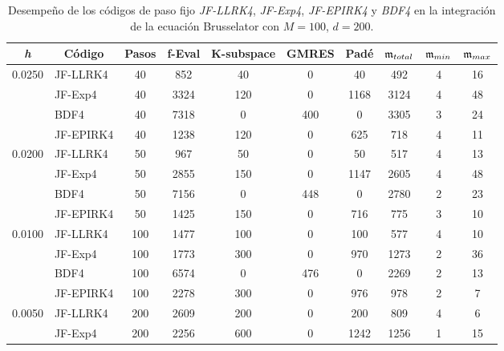 \begin{table}[htb]
	\caption{Desempeño de los códigos de paso fijo \textit{JF-LLRK4}, \textit{JF-Exp4}, \textit{JF-EPIRK4} y \textit{BDF4} en la integración de la ecuación Brusselator con $M=100$, $d=200$.}
	\centering
	\begin{adjustbox}{width=0.9\columnwidth,center}
		\begin{tabular}{cccccccccc}
			\hline
			\textit{h} & Código & Pasos & f-Eval & K-subspace & GMRES & Padé & $\mathfrak{m}_{total}$ & $\mf%
			_{min}$ & $\mathfrak{m}_{max}$ \\ \hline
			\multicolumn{1}{l}{0.0250} & \multicolumn{1}{l}{JF-LLRK4} & 40 & 852 & 40 &
			0 & 40 & 492 & 4 & 16 \\
			\multicolumn{1}{l}{} & \multicolumn{1}{l}{JF-Exp4} & 40 & 3324 & 120 & 0 &
			1168 & 3124 & 4 & 48 \\
			\multicolumn{1}{l}{} & \multicolumn{1}{l}{BDF4} & 40 & 7318 & 0 & 400 & 0 &
			3305 & 3 & 24 \\
			\multicolumn{1}{l}{} & \multicolumn{1}{l}{JF-EPIRK4} & 40 & 1238 & 120 & 0 &
			625 & 718 & 4 & 11 \\
			\multicolumn{1}{l}{0.0200} & \multicolumn{1}{l}{JF-LLRK4} & 50 & 967 & 50 &
			0 & 50 & 517 & 4 & 13 \\
			\multicolumn{1}{l}{} & \multicolumn{1}{l}{JF-Exp4} & 50 & 2855 & 150 & 0 &
			1147 & 2605 & 4 & 48 \\
			\multicolumn{1}{l}{} & \multicolumn{1}{l}{BDF4} & 50 & 7156 & 0 & 448 & 0 &
			2780 & 2 & 23 \\
			\multicolumn{1}{l}{} & \multicolumn{1}{l}{JF-EPIRK4} & 50 & 1425 & 150 & 0 &
			716 & 775 & 3 & 10 \\
			\multicolumn{1}{l}{0.0100} & \multicolumn{1}{l}{JF-LLRK4} & 100 & 1477 & 100
			& 0 & 100 & 577 & 4 & 10 \\
			\multicolumn{1}{l}{} & \multicolumn{1}{l}{JF-Exp4} & 100 & 1773 & 300 & 0 &
			970 & 1273 & 2 & 36 \\
			\multicolumn{1}{l}{} & \multicolumn{1}{l}{BDF4} & 100 & 6574 & 0 & 476 & 0 &
			2269 & 2 & 13 \\
			\multicolumn{1}{l}{} & \multicolumn{1}{l}{JF-EPIRK4} & 100 & 2278 & 300 & 0 &
			976 & 978 & 2 & 7 \\
			\multicolumn{1}{l}{0.0050} & \multicolumn{1}{l}{JF-LLRK4} & 200 & 2609 & 200
			& 0 & 200 & 809 & 4 & 6 \\
			\multicolumn{1}{l}{} & \multicolumn{1}{l}{JF-Exp4} & 200 & 2256 & 600 & 0 &
			1242 & 1256 & 1 & 15 \\

\end{tabular}
\end{adjustbox}
\end{table}

